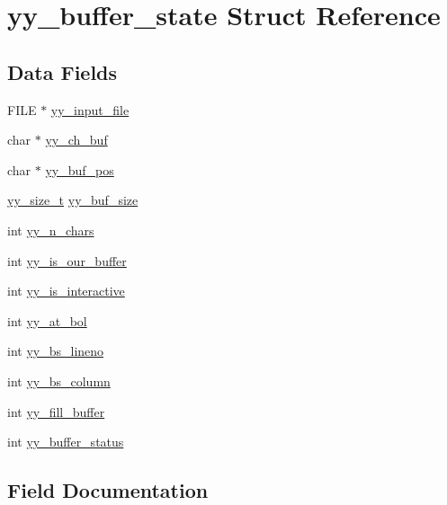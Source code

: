 \hypertarget{structyy__buffer__state}{}\section{yy\+\_\+buffer\+\_\+state Struct Reference}
\label{structyy__buffer__state}
\subsection*{Data Fields}
\begin{DoxyCompactItemize}
\item 
F\+I\+LE $\ast$ \hyperlink{structyy__buffer__state_afb2a40bf9a1b84be81d8e8c0bbcbee21}{yy\+\_\+input\+\_\+file}
\item 
char $\ast$ \hyperlink{structyy__buffer__state_af61a9e79f8fc1edb3ae8a2fa2952ce22}{yy\+\_\+ch\+\_\+buf}
\item 
char $\ast$ \hyperlink{structyy__buffer__state_ae8850ab3d90f9339c392020e7d83c4c7}{yy\+\_\+buf\+\_\+pos}
\item 
\hyperlink{lex_8yy_8c_ad557845057f187eec4be07e2717d2afa}{yy\+\_\+size\+\_\+t} \hyperlink{structyy__buffer__state_a98a79041ff2a95eaa8a5c6d1e1562306}{yy\+\_\+buf\+\_\+size}
\item 
int \hyperlink{structyy__buffer__state_aa86c122f2050dbfd365fcf547e6fc1c3}{yy\+\_\+n\+\_\+chars}
\item 
int \hyperlink{structyy__buffer__state_a1e64bbdc1343d886bee3af97e19644bc}{yy\+\_\+is\+\_\+our\+\_\+buffer}
\item 
int \hyperlink{structyy__buffer__state_a2a823a361fbbe1af51a957d0d0cbf4e2}{yy\+\_\+is\+\_\+interactive}
\item 
int \hyperlink{structyy__buffer__state_a8e60af6806593faf52d1cc01148af6e3}{yy\+\_\+at\+\_\+bol}
\item 
int \hyperlink{structyy__buffer__state_a59c414c619ca0071fe3a091336106d82}{yy\+\_\+bs\+\_\+lineno}
\item 
int \hyperlink{structyy__buffer__state_ad9867983bbc1666304d83623cd6e3dd8}{yy\+\_\+bs\+\_\+column}
\item 
int \hyperlink{structyy__buffer__state_a5e492694db97a0d7760d8cc5fd058dfd}{yy\+\_\+fill\+\_\+buffer}
\item 
int \hyperlink{structyy__buffer__state_a6ca09e676a787676260c558a0f731285}{yy\+\_\+buffer\+\_\+status}
\end{DoxyCompactItemize}


\subsection{Field Documentation}
\mbox{\label{structyy__buffer__state_a8e60af6806593faf52d1cc01148af6e3}} 
